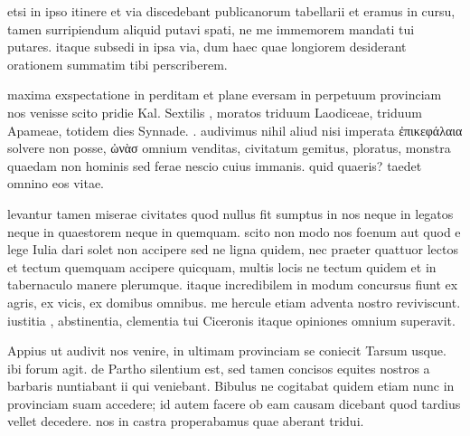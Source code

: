 


 etsi in ipso itinere et via discedebant publicanorum tabellarii et eramus in cursu, tamen surripiendum aliquid putavi spati, ne me immemorem mandati tui putares. itaque subsedi in ipsa via, dum haec quae longiorem desiderant orationem summatim tibi perscriberem.

 maxima exspectatione in perditam et plane eversam in perpetuum provinciam nos venisse scito pridie Kal. Sextilis , moratos triduum Laodiceae, triduum Apameae, totidem dies Synnade. . audivimus nihil aliud nisi imperata ἐπικεφάλαια solvere non posse, ὠνὰσ omnium venditas, civitatum gemitus, ploratus, monstra quaedam non hominis sed ferae nescio cuius immanis. quid quaeris? taedet omnino eos vitae.

 levantur tamen miserae civitates quod nullus fit sumptus in nos neque in legatos neque in quaestorem neque in quemquam. scito non modo nos foenum aut quod e lege Iulia dari solet non accipere sed ne ligna quidem, nec praeter quattuor lectos et tectum quemquam accipere quicquam, multis locis ne tectum quidem et in tabernaculo manere plerumque. itaque incredibilem in modum concursus fiunt ex agris, ex vicis, ex domibus omnibus. me hercule etiam adventa nostro reviviscunt. iustitia , abstinentia, clementia tui Ciceronis itaque opiniones omnium superavit.

 Appius ut audivit nos venire, in ultimam provinciam se coniecit Tarsum usque. ibi forum agit. de Partho silentium est, sed tamen concisos equites nostros a barbaris nuntiabant ii qui veniebant. Bibulus ne cogitabat quidem etiam nunc in provinciam suam accedere; id autem facere ob eam causam dicebant quod tardius vellet decedere. nos in castra properabamus quae aberant tridui.

